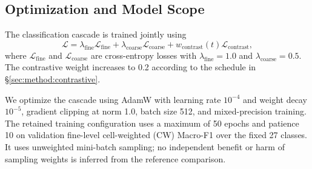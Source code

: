 \subsection{Optimization and Model Scope}
\label{sec:method:training}

The classification cascade is trained jointly using
\begin{equation}
\mathcal{L}
=
\lambda_{\text{fine}}\mathcal{L}_{\text{fine}}
+
\lambda_{\text{coarse}}\mathcal{L}_{\text{coarse}}
+
w_{\text{contrast}}(t)\mathcal{L}_{\text{contrast}},
\end{equation}
where $\mathcal{L}_{\text{fine}}$ and $\mathcal{L}_{\text{coarse}}$ are cross-entropy losses with $\lambda_{\text{fine}}=1.0$ and $\lambda_{\text{coarse}}=0.5$. The contrastive weight increases to 0.2 according to the schedule in \S\ref{sec:method:contrastive}.

We optimize the cascade using AdamW with learning rate $10^{-4}$ and weight decay $10^{-5}$, gradient clipping at norm 1.0, batch size 512, and mixed-precision training. The retained training configuration uses a maximum of 50 epochs and patience 10 on validation fine-level cell-weighted (CW) Macro-F1 over the fixed 27 classes. It uses unweighted mini-batch sampling; no independent benefit or harm of sampling weights is inferred from the reference comparison.

